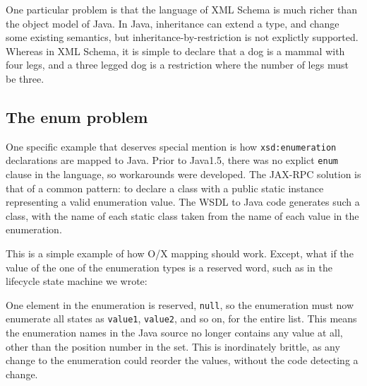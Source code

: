 \documentclass[draft]{article}
\begin{document}
One particular problem is that the language of XML Schema is much richer than 
the object model of Java. In Java, inheritance can extend a type, and change
some existing semantics, but inheritance-by-restriction is not explictly
supported. Whereas in XML Schema, it is simple to declare that a dog is a mammal 
with four legs, and a three legged dog is a restriction where the number of legs
must be three. 

\subsection{The enum problem}

One specific example that deserves special mention is how \verb$xsd:enumeration$
declarations are mapped to Java. Prior to Java1.5, there was no explict
\verb$enum$ clause in the language, so workarounds were developed. The JAX-RPC
solution is that of a common pattern: to declare a class with a public static
instance representing a valid enumeration value. The WSDL to Java code generates
such a class, with the name of each static class taken from the name of each
value in the enumeration. 

This is a simple example of how O/X mapping should work. Except, what if the
value of the one of the enumeration types is a reserved word, such as in the
lifecycle state machine we wrote:

\verb$$

One element in the enumeration is reserved, \verb|null|, so the enumeration must
now enumerate all states as \verb|value1|, \verb|value2|, and so on, for
the entire list. This means the enumeration names in the Java source no longer 
contains any value at all, other than the position number in the set. This is
inordinately brittle, as any change to the enumeration could reorder the values,
without the code detecting a change.


% 
% 
% 
% 
\end{document}
